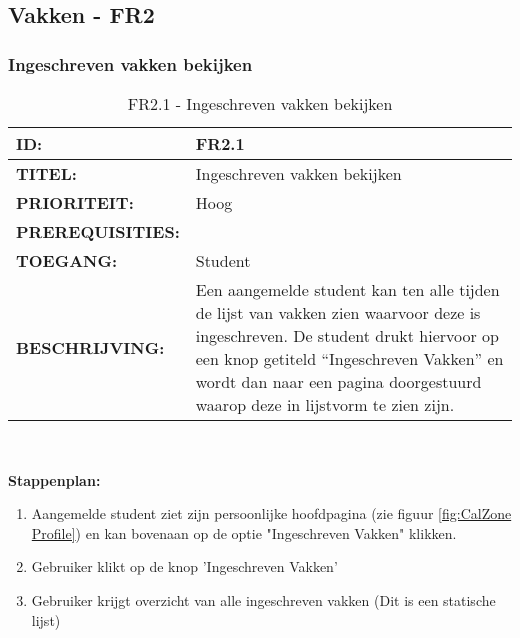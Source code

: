 \subsection{Vakken - FR2} 

\subsubsection{Ingeschreven vakken bekijken}      
\noindent\begin{table}[H]
            \begin{tabular}{l | p{10cm}}
                \textbf{ID:} & FR2.1 \\ \hline
                \textbf{TITEL:} & Ingeschreven vakken bekijken\\ \hline
                \textbf{PRIORITEIT:} &  Hoog \\ \hline
                \textbf{PREREQUISITIES:} & \\ \hline
                \textbf{TOEGANG:} &  Student \\ \hline
                \textbf{BESCHRIJVING:} & Een aangemelde student kan ten alle tijden de lijst van vakken zien waarvoor deze is ingeschreven. De student drukt hiervoor op een knop getiteld “Ingeschreven Vakken” en wordt dan naar een pagina doorgestuurd waarop deze in lijstvorm te zien zijn.\\
            \end{tabular}\\
            \caption{FR2.1 - Ingeschreven vakken bekijken}
            \label{tab:FR2.1 - Ingeschreven vakken bekijken}
        \end{table}  
        
\textbf{Stappenplan:}
	\begin{enumerate}
	\item Aangemelde student ziet zijn persoonlijke hoofdpagina (zie figuur \ref{fig:CalZone Profile}) en kan bovenaan op de optie "Ingeschreven Vakken" klikken.
	\item Gebruiker klikt op de knop 'Ingeschreven Vakken'
	\item Gebruiker krijgt overzicht van alle ingeschreven vakken (Dit is een statische lijst)
	\end{enumerate}

